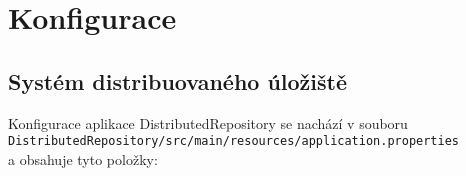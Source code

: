 


\chapter{Konfigurace} \label{configuration}
\section{Systém distribuovaného úložiště}
Konfigurace aplikace DistributedRepository se nachází v souboru \\ \texttt{DistributedRepository/src/main/resources/application.properties} \\
a obsahuje tyto položky:

